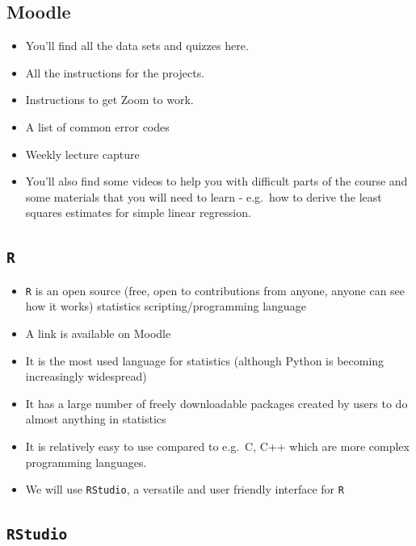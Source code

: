 \documentclass[
]{gitbook}
\providecommand{\tightlist}{%
  \setlength{\itemsep}{0pt}\setlength{\parskip}{0pt}}
\begin{document}
\hypertarget{moodle}{%
\subsection{Moodle}\label{moodle}}

\begin{itemize}
\tightlist
\item
  You'll find all the data sets and quizzes here.
\item
  All the instructions for the projects.
\item
  Instructions to get Zoom to work.
\item
  A list of common error codes
\item
  Weekly lecture capture
\item
  You'll also find some videos to help you with difficult parts of the course and some materials that you will need to learn - e.g.~how to derive the least squares estimates for simple linear regression.
\end{itemize}

\hypertarget{r}{%
\subsection{\texorpdfstring{\texttt{R}}{R}}\label{r}}

\begin{itemize}
\tightlist
\item
  \texttt{R} is an open source (free, open to contributions from anyone, anyone can see how it works) statistics scripting/programming language
\item
  A link is available on Moodle
\item
  It is the most used language for statistics (although Python is becoming increasingly widespread)
\item
  It has a large number of freely downloadable packages created by users to do almost anything in statistics
\item
  It is relatively easy to use compared to e.g.~C, C++ which are more complex programming languages.
\item
  We will use \texttt{RStudio}, a versatile and user friendly interface for \texttt{R}
\end{itemize}

\hypertarget{rstudio}{%
\subsection{\texorpdfstring{\texttt{RStudio}}{RStudio}}\label{rstudio}}
\end{document}
